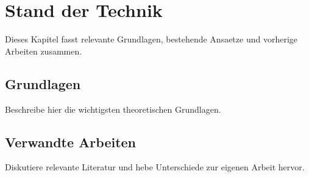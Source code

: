 \section{Stand der Technik}

Dieses Kapitel fasst relevante Grundlagen, bestehende Ansaetze und
vorherige Arbeiten zusammen.

\subsection{Grundlagen}

Beschreibe hier die wichtigsten theoretischen Grundlagen.

\subsection{Verwandte Arbeiten}

Diskutiere relevante Literatur und hebe Unterschiede zur eigenen Arbeit hervor.
